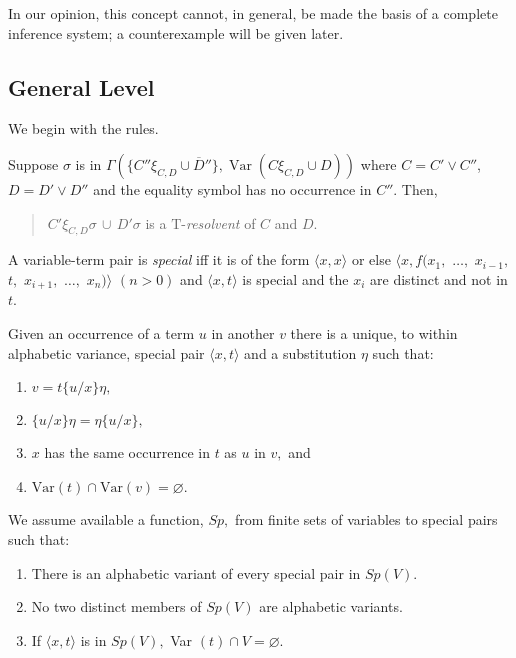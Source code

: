 \documentclass[letterpaper]{report}
\begin{document}
In our opinion, this concept cannot, in general, be made the basis of a
complete inference system; a counterexample will be given later.

\subsection*{General Level}\label{general-level}

We begin with the rules.

Suppose $\sigma$ is in
$\Gamma(\{C''\xi_{C,D}\cup\overline{D}''\}, \operatorname{Var}
(C\xi_{C,D}\cup D))$ where $C=C'\vee C''$,
$D=D'\lor D''$ and the equality symbol has no
occurrence in $C''$. Then,
\begin{quote}
$C'\xi_{C,D}\sigma\,\cup\,D'\sigma$ is a
$\mathrm{T}$-\emph{resolvent} of $C$ and $D$.
\end{quote}

A variable-term pair is \emph{special} iff it is of the form
$\langle x,x\rangle$ or else
$\langle x, f(x_{1},$ $\ldots,$ $x_{i-1},$ $t,$ $x_{i+1},$ $\ldots,$ $x_{n})\rangle$ $(n>0)$
and $\langle x, t\rangle$ is special and the $x_{i}$ are distinct
and not in $t$.

Given an occurrence of a term $u$ in another $v$ there is a unique,
to within alphabetic variance, special pair $\langle x, t\rangle$
and a substitution $\eta$ such that:

\begin{enumerate}
	\def\labelenumi{(\arabic{enumi})}
	\item
	$v=t\{u/x\}\eta,$
	\item
	$\{u/x\}\eta=\eta\{u/x\},$
	\item
	$x$ has the same occurrence in $t$ as $u$ in $v,$ and
	\item
	$\mbox{Var}(t)\cap\mbox{Var}(v)=\varnothing$.
\end{enumerate}

We assume available a function, $Sp,$ from finite sets of variables to
special pairs such that:

\begin{enumerate}
	\def\labelenumi{(\arabic{enumi})}
	\item
	There is an alphabetic variant of every special pair in $Sp(V).$
	\item
	No two distinct members of $Sp(V)$ are alphabetic variants.
	\item
	If $\langle x, t\rangle$ is in $Sp(V),$ Var
	$(t)\cap V=\varnothing$.
\end{enumerate}
\end{document}
